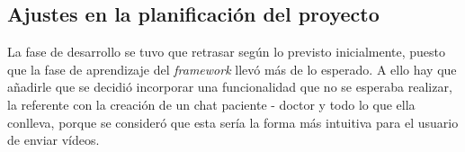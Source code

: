 \subsection{Ajustes en la planificación del proyecto}
La fase de desarrollo se tuvo que retrasar según lo previsto inicialmente, puesto que la fase
de aprendizaje del \textit{framework} llevó más de lo esperado. A ello hay que añadirle que se
decidió incorporar una funcionalidad que no se esperaba realizar, la referente con la creación de
un chat paciente - doctor y todo lo que ella conlleva, porque se consideró que esta sería la forma
más intuitiva para el usuario de enviar vídeos.